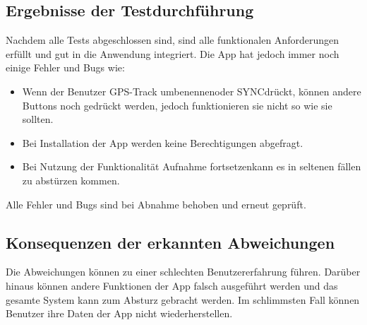 \documentclass{article}
\begin{document}
\subsection{Ergebnisse der Testdurchführung}
	Nachdem alle Tests abgeschlossen sind, sind alle funktionalen Anforderungen erfüllt und gut in die Anwendung integriert. Die App hat jedoch immer noch einige Fehler und Bugs wie:
	\begin{itemize}
		\item Wenn der Benutzer \glqq GPS-Track umbenennen\grqq\space oder \glqq SYNC\grqq\space drückt, können andere Buttons noch gedrückt werden, jedoch funktionieren sie nicht so wie sie sollten.
		\item Bei Installation der App werden keine Berechtigungen abgefragt.
		\item Bei Nutzung der Funktionalität \glqq Aufnahme fortsetzen\grqq\space kann es in seltenen fällen zu abstürzen kommen.
	\end{itemize}
	Alle Fehler und Bugs sind bei Abnahme behoben und erneut geprüft.
\subsection{Konsequenzen der erkannten Abweichungen}
	Die Abweichungen können zu einer schlechten Benutzererfahrung führen. Darüber hinaus können andere Funktionen der App falsch ausgeführt werden und das gesamte System kann zum Absturz gebracht werden. Im schlimmsten Fall können Benutzer ihre Daten der App nicht wiederherstellen.
\end{document}
